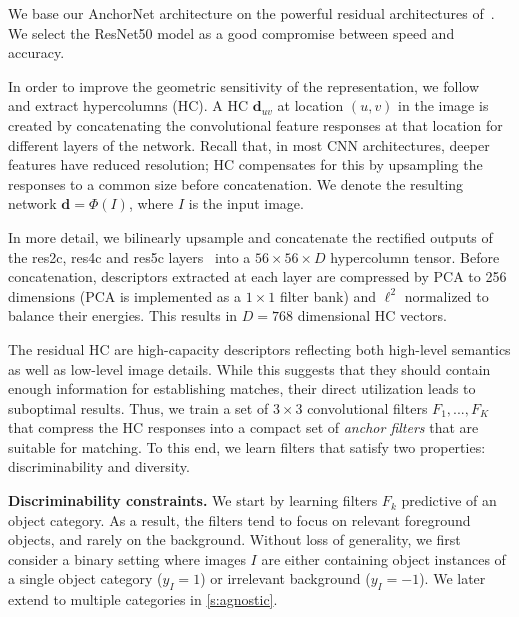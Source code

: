 \documentclass[10pt,twocolumn,letterpaper]{article}
\newcommand{\myparagraph}[1]{\vspace{0.15cm}\noindent\textbf{#1.}}
\begin{document}
We base our AnchorNet architecture on the powerful residual architectures of~\cite{he2015deep}. We select the ResNet50 model as a good compromise between speed and accuracy.

In order to improve the geometric sensitivity of the representation, we follow~\cite{hariharan15hypercolumns} and extract hypercolumns (HC). A HC $\mathbf{d}_{uv}$ at location $(u,v)$ in the image is created by concatenating the convolutional feature responses at that location for different layers of the network. 
Recall that, in most CNN architectures, deeper features have reduced resolution; HC compensates for this by upsampling the responses to a common size before concatenation. We denote the resulting network $\mathbf{d}=\Phi(I)$, where $I$ is the input image.

In more detail, we bilinearly upsample and concatenate the rectified outputs of the res2c, res4c and res5c layers~\cite{he2015deep} into a $56 \times 56 \times D$ hypercolumn tensor. Before concatenation, descriptors extracted at each layer are compressed by PCA to 256 dimensions (PCA is implemented as a $1\times 1$ filter bank) and $\ell^2$ normalized to balance their energies. This results in $D=768$ dimensional HC vectors. %

The residual HC are high-capacity descriptors reflecting both high-level semantics as well as low-level image details. While this suggests
that they should contain enough information for establishing matches,
their direct utilization leads to suboptimal results. Thus, we train a set of $3\times3$ convolutional filters $F_1, ..., F_K$ that compress the HC responses into a compact set of \emph{anchor filters} that are suitable for matching. To this end, we learn filters that satisfy two properties: discriminability and diversity.

\myparagraph{Discriminability constraints}
We start by learning filters $F_k$ predictive of an object category.
As a result, the filters tend to focus on relevant foreground objects, and rarely on the background.
Without loss of generality, we first consider a binary setting where images $I$ are either 
containing object instances of a single object category ($y_I = 1$) or irrelevant background ($y_I =-1$).
We later extend to multiple categories in \cref{s:agnostic}. 
\end{document}
